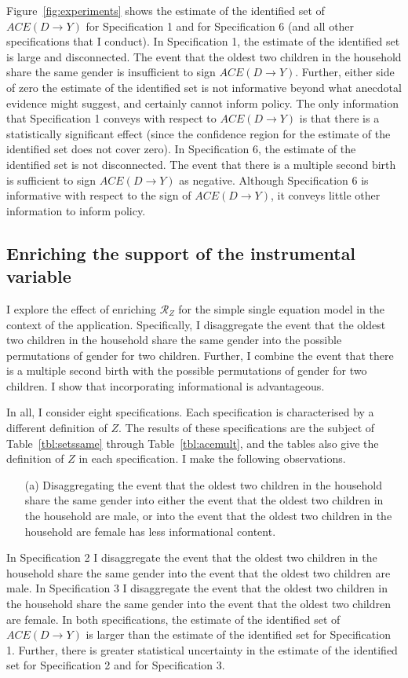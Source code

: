 \documentclass[12pt,a4paper,twoside]{article}
\numberwithin{equation}{section}
\begin{document}
Figure~\ref{fig:experiments} shows the estimate of the identified set of $ACE(D\rightarrow Y)$ for Specification 1 and for Specification 6 (and all other specifications that I conduct). In Specification 1, the estimate of the identified set is large and disconnected. The event that the oldest two children in the household share the same gender is insufficient to sign $ACE(D\rightarrow Y)$. Further, either side of zero the estimate of the identified set is not informative beyond what anecdotal evidence might suggest, and certainly cannot inform policy. The only information that Specification 1 conveys with respect to $ACE(D\rightarrow Y)$ is that there is a statistically significant effect (since the confidence region for the estimate of the identified set does not cover zero). In Specification 6, the estimate of the identified set is not disconnected. The event that there is a multiple second birth is sufficient to sign $ACE(D\rightarrow Y)$ as negative. Although Specification 6 is informative with respect to the sign of $ACE(D\rightarrow Y)$, it conveys little other information to inform policy.  
\subsection{Enriching the support of the instrumental variable}
I explore the effect of enriching $\mathcal{R}_Z$ for the simple single equation model in the context of the application. Specifically, I disaggregate the event that the oldest two children in the household share the same gender into the possible permutations of gender for two children. Further, I combine the event that there is a multiple second birth with the possible permutations of gender for two children. I show that incorporating informational is advantageous.

In all, I consider eight specifications. Each specification is characterised by a different definition of $Z$. The results of these specifications are the subject of Table~\ref{tbl:setssame} through Table~\ref{tbl:acemult}, and the tables also give the definition of $Z$ in each specification. I make the following observations.
\begin{enumerate}
\item[(a)] Disaggregating the event that the oldest two children in the household share the same gender into either the event that the oldest two children in the household are male, or into the event that the oldest two children in the household are female has less informational content.
\end{enumerate}
In Specification 2 I disaggregate the event that the oldest two children in the household share the same gender into the event that the oldest two children are male. In Specification 3 I disaggregate the event that the oldest two children in the household share the same gender into the event that the oldest two children are female. In both specifications, the estimate of the identified set of $ACE(D\rightarrow Y)$ is larger than the estimate of the identified set for Specification 1. Further, there is greater statistical uncertainty in the estimate of the identified set for Specification 2 and for Specification 3.  
\end{document}

